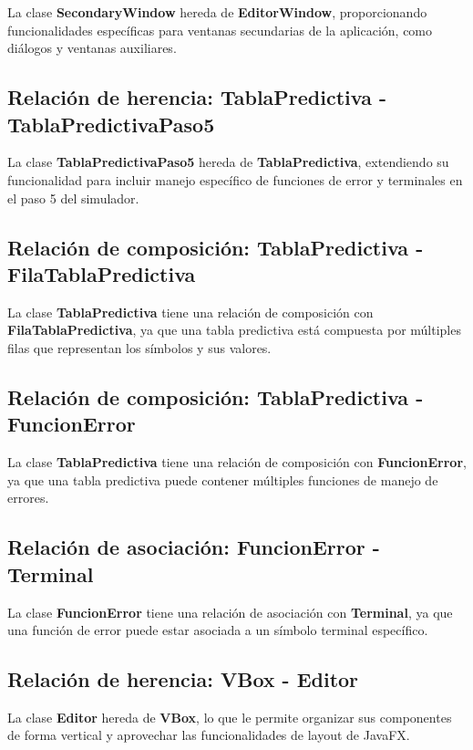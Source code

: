 La clase \textbf{SecondaryWindow} hereda de \textbf{EditorWindow}, proporcionando funcionalidades específicas para ventanas secundarias de la aplicación, como diálogos y ventanas auxiliares.

\subsection{Relación de herencia: TablaPredictiva - TablaPredictivaPaso5}

La clase \textbf{TablaPredictivaPaso5} hereda de \textbf{TablaPredictiva}, extendiendo su funcionalidad para incluir manejo específico de funciones de error y terminales en el paso 5 del simulador.

\subsection{Relación de composición: TablaPredictiva - FilaTablaPredictiva}

La clase \textbf{TablaPredictiva} tiene una relación de composición con \textbf{FilaTablaPredictiva}, ya que una tabla predictiva está compuesta por múltiples filas que representan los símbolos y sus valores.

\subsection{Relación de composición: TablaPredictiva - FuncionError}

La clase \textbf{TablaPredictiva} tiene una relación de composición con \textbf{FuncionError}, ya que una tabla predictiva puede contener múltiples funciones de manejo de errores.

\subsection{Relación de asociación: FuncionError - Terminal}

La clase \textbf{FuncionError} tiene una relación de asociación con \textbf{Terminal}, ya que una función de error puede estar asociada a un símbolo terminal específico.

\subsection{Relación de herencia: VBox - Editor}

La clase \textbf{Editor} hereda de \textbf{VBox}, lo que le permite organizar sus componentes de forma vertical y aprovechar las funcionalidades de layout de JavaFX.

